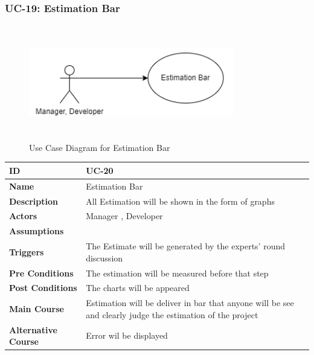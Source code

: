     \newpage

    \subsubsection{UC-19: Estimation Bar}
    \begin{figure}[H]
        \includegraphics[height=5cm, width=0.8\textwidth]{./diagrams/Use Case/u19.png}
        \centering 
        \caption{Use Case Diagram for Estimation Bar}
        \label{fig:Usecase1}
        \end{figure}
        
    \begin{center}
        \begin{tabularx}{\textwidth}{|l|X|}
            \hline
            \textbf{ID} & UC-20 \\
            \hline
            \textbf{Name} & Estimation Bar \\
            \hline
            \textbf{Description} & All Estimation will be shown in the form of graphs \\
            \hline
            \textbf{Actors} & Manager , Developer \\
            \hline
            \textbf{Assumptions} &  \\
            \hline
            \textbf{Triggers} & The Estimate will be generated by the experts' round discussion \\
            \hline
            \textbf{Pre Conditions} & The estimation will be measured before that step  \\
            \hline
            \textbf{Post Conditions} & The charts will be appeared \\
            \hline
            \textbf{Main Course} & Estimation will be deliver in bar that anyone will be see and clearly judge the estimation of the project \\
            \hline
            \textbf{Alternative Course} & Error wil be displayed \\
            \hline
            
        \end{tabularx}
    \end{center}
    \newpage
    

  